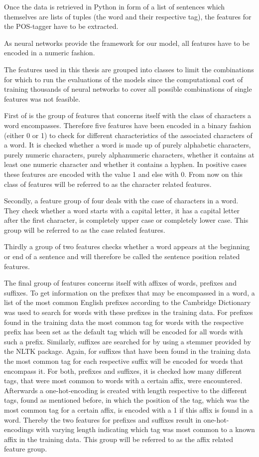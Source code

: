 Once the data is retrieved in Python in form of a list of sentences which themselves are lists of tuples (the word and their respective tag), the features for the POS-tagger have to be extracted.

As neural networks provide the framework for our model, all features have to be encoded in a numeric fashion.

The features used in this thesis are grouped into classes to limit the combinations for which to run the evaluations of the models since the computational cost of training thousands of neural networks to cover all possible combinations of single features was not feasible.

First of is the group of features that concerns itself with the class of characters a word encompasses. Therefore five features have been encoded in a binary fashion (either 0 or 1) to check for different characteristics of the associated characters of a word. It is checked whether a word is made up of purely alphabetic characters, purely numeric characters, purely alphanumeric characters, whether it contains at least one numeric character and whether it contains a hyphen. In positive cases these features are encoded with the value 1 and else with 0. From now on this class of features will be referred to as the character related features.

Secondly, a feature group of four deals with the case of characters in a word. They check whether a word starts with a capital letter, it has a capital letter after the first character, is completely upper case or completely lower case. This group will be referred to as the case related features.

Thirdly a group of two features checks whether a word appears at the beginning or end of a sentence and will therefore be called the sentence position related features.

The final group of features concerns itself with affixes of words, prefixes and suffixes. To get information on the prefixes that may be encompassed in a word, a list of the most common English prefixes according to the Cambridge Dictionary \citep{cambridge2022prefix} was used to search for words with these prefixes in the training data. 
For prefixes found in the training data the most common tag for words with the respective prefix has been set as the default tag which will be encoded for all words with such a prefix.
Similarly, suffixes are searched for by using a stemmer provided by the NLTK package. Again, for suffixes that have been found in the training data the most common tag for each respective suffix will be encoded for words that encompass it.
For both, prefixes and suffixes, it is checked how many different tags, that were most common to words with a certain affix, were encountered. Afterwards a one-hot-encoding is created with length respective to the different tags, found as mentioned before, in which the position of the tag, which was the most common tag for a certain affix, is encoded with a 1 if this affix is found in a word. Thereby the two features for prefixes and suffixes result in one-hot-encodings with varying length indicating which tag was most common to a known affix in the training data. This group will be referred to as the affix related feature group.
